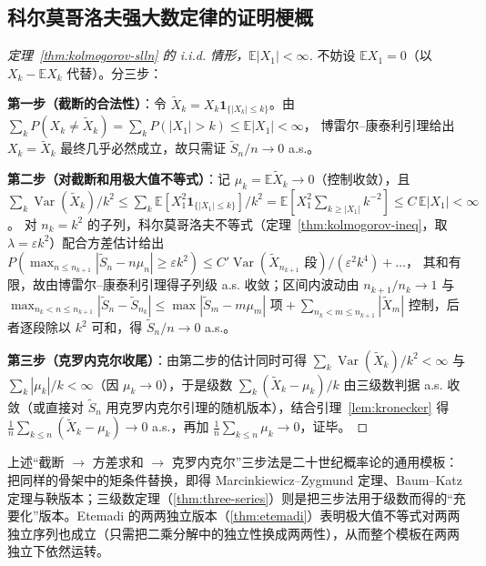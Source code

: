 \subsection{科尔莫哥洛夫强大数定律的证明梗概}

\begin{proof}[定理~\ref{thm:kolmogorov-slln} 的 i.i.d. 情形，$\mathbb{E}|X_1| < \infty$]
    不妨设 $\mathbb{E}X_1 = 0$（以 $X_k - \mathbb{E}X_k$ 代替）。分三步：

    \textbf{第一步（截断的合法性）}：令 $\tilde{X}_k = X_k \mathbf{1}_{\{|X_k| \leq k\}}$。由
    $\sum_k P(X_k \neq \tilde{X}_k) = \sum_k P(|X_1| > k) \leq \mathbb{E}|X_1| < \infty$，
    博雷尔--康泰利引理给出 $X_k = \tilde{X}_k$ 最终几乎必然成立，故只需证 $\tilde{S}_n/n \to 0$ a.s.。

    \textbf{第二步（对截断和用极大值不等式）}：记 $\mu_k = \mathbb{E}\tilde{X}_k \to 0$（控制收敛），且
    $\sum_k \operatorname{Var}(\tilde{X}_k)/k^2 \leq \sum_k \mathbb{E}[X_1^2 \mathbf{1}_{\{|X_1| \leq k\}}]/k^2 = \mathbb{E}\left[X_1^2 \sum_{k \geq |X_1|} k^{-2}\right] \leq C\,\mathbb{E}|X_1| < \infty$。
    对 $n_k = k^2$ 的子列，科尔莫哥洛夫不等式（定理~\ref{thm:kolmogorov-ineq}，取 $\lambda = \varepsilon k^2$）配合方差估计给出
    $P\left(\max_{n \leq n_{k+1}} |\tilde{S}_n - n\mu_n| \geq \varepsilon k^2\right) \leq C' \operatorname{Var}(\tilde{X}_{n_{k+1}}\text{ 段})/(\varepsilon^2 k^4) + \ldots$，
    其和有限，故由博雷尔--康泰利引理得子列级 a.s. 收敛；区间内波动由 $n_{k+1}/n_k \to 1$ 与 $\max_{n_k < n \leq n_{k+1}} |\tilde{S}_n - \tilde{S}_{n_k}| \leq \max |\tilde{S}_m - m \mu_m| \text{ 项} + \sum_{n_k < m \leq n_{k+1}} |\tilde{X}_m|$ 控制，后者逐段除以 $k^2$ 可和，得 $\tilde{S}_n/n \to 0$ a.s.。

    \textbf{第三步（克罗内克尔收尾）}：由第二步的估计同时可得 $\sum_k \operatorname{Var}(\tilde{X}_k)/k^2 < \infty$ 与 $\sum_k |\mu_k|/k < \infty$（因 $\mu_k \to 0$），于是级数 $\sum_k (\tilde{X}_k - \mu_k)/k$ 由三级数判据 a.s. 收敛（或直接对 $\tilde{S}_n$ 用克罗内克尔引理的随机版本），结合引理~\ref{lem:kronecker} 得
    $\frac{1}{n}\sum_{k \leq n} (\tilde{X}_k - \mu_k) \to 0$ a.s.，再加 $\frac{1}{n}\sum_{k \leq n} \mu_k \to 0$，证毕。
\end{proof}

\begin{remark}
    上述“截断 $\to$ 方差求和 $\to$ 克罗内克尔”三步法是二十世纪概率论的通用模板：把同样的骨架中的矩条件替换，即得 Marcinkiewicz--Zygmund 定理、Baum--Katz 定理与鞅版本；三级数定理（\cref{thm:three-series}）则是把三步法用于级数而得的“充要化”版本。Etemadi 的两两独立版本（\cref{thm:etemadi}）表明极大值不等式对两两独立序列也成立（只需把二乘分解中的独立性换成两两性），从而整个模板在两两独立下依然运转。
\end{remark}

